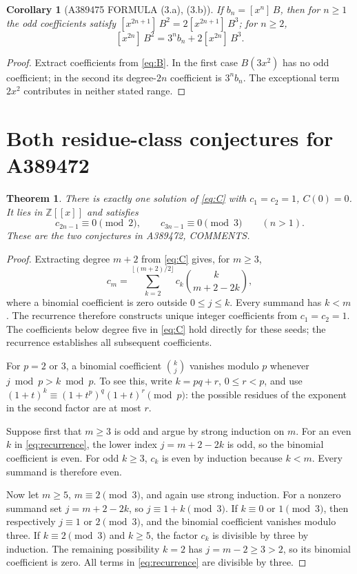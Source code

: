 \documentclass[11pt]{article}
\newtheorem{theorem}{Theorem}
\newtheorem*{consequence}{Corollary}
\newcommand{\Z}{\mathbb Z}
\newcommand{\coef}[2]{[x^{#1}]\,#2}
\begin{document}
\begin{consequence}[A389475 FORMULA (3.a), (3.b)]
If $b_n=\coef{n}{B}$,
then for $n\ge1$ the odd coefficients satisfy
$\coef{2n+1}{B^2}=2\coef{2n+1}{B^3}$; for $n\ge2$,
\[
 \coef{2n}{B^2}=3^n b_n+2\coef{2n}{B^3}.
\]
\end{consequence}
\begin{proof}
Extract coefficients from \eqref{eq:B}.
In the first case $B(3x^2)$ has no odd coefficient; in the
second its degree-$2n$ coefficient is $3^n b_n$.
The exceptional term $2x^2$ contributes in neither stated range.
\end{proof}

\section{Both residue-class conjectures for A389472}

\begin{theorem}\label{thm:C}
There is exactly one solution of \eqref{eq:C} with
$c_1=c_2=1$, $C(0)=0$. It lies in $\Z[[x]]$ and satisfies
\[
 c_{2n-1}\equiv0\pmod2,\qquad
 c_{3n-1}\equiv0\pmod3\qquad(n>1).
\]
These are the two conjectures in A389472, COMMENTS.
\end{theorem}
\begin{proof}
Extracting degree $m+2$ from \eqref{eq:C} gives, for $m\ge3$,
\begin{equation}\label{eq:recurrence}
 c_m=\sum_{k=2}^{\lfloor(m+2)/2\rfloor}
 c_k\binom{k}{m+2-2k},
\end{equation}
where a binomial coefficient is zero outside $0\le j\le k$.
Every summand has $k<m$. The recurrence therefore constructs unique
integer coefficients from $c_1=c_2=1$. The coefficients below degree
five in \eqref{eq:C} hold directly for these seeds; the recurrence
establishes all subsequent coefficients.

For $p=2$ or $3$, a binomial coefficient $\binom{k}{j}$
vanishes modulo $p$ whenever $j\bmod p>k\bmod p$.
To see this, write $k=pq+r$, $0\le r<p$, and use
$(1+t)^k\equiv(1+t^p)^q(1+t)^r\pmod p$:
the possible residues of the exponent in the second factor are at most $r$.

Suppose first that $m\ge3$ is odd and argue by strong induction on $m$.
For an even $k$ in \eqref{eq:recurrence}, the lower index
$j=m+2-2k$ is odd, so the binomial coefficient is even.
For odd $k\ge3$, $c_k$ is even by induction because $k<m$.
Every summand is therefore even.

Now let $m\ge5$, $m\equiv2\pmod3$, and again use strong induction.
For a nonzero summand set $j=m+2-2k$, so
$j\equiv1+k\pmod3$.
If $k\equiv0$ or $1\pmod3$, then respectively
$j\equiv1$ or $2\pmod3$, and the binomial coefficient vanishes modulo three.
If $k\equiv2\pmod3$ and $k\ge5$, the factor $c_k$ is divisible
by three by induction. The remaining possibility $k=2$ has
$j=m-2\ge3>2$, so its binomial coefficient is zero.
All terms in \eqref{eq:recurrence} are divisible by three.
\end{proof}
\end{document}
